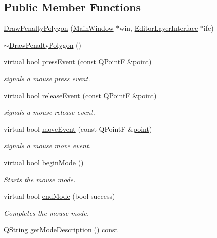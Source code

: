 \subsection*{Public Member Functions}
\begin{DoxyCompactItemize}
\item 
\mbox{\hyperlink{class_draw_penalty_polygon_af2f3eb1832f331c5c3244c9e6c403b74}{Draw\+Penalty\+Polygon}} (\mbox{\hyperlink{class_main_window}{Main\+Window}} $\ast$win, \mbox{\hyperlink{class_editor_layer_interface}{Editor\+Layer\+Interface}} $\ast$ifc)
\item 
\mbox{\hyperlink{class_draw_penalty_polygon_a706e3a1c22a058842eab17cbe43bcede}{$\sim$\+Draw\+Penalty\+Polygon}} ()
\item 
virtual bool \mbox{\hyperlink{class_draw_penalty_polygon_a52d402862dd2cf9072c6451beee36dc0}{press\+Event}} (const Q\+PointF \&\mbox{\hyperlink{diffusion_8cpp_a380468221cb8294f9329d11c99c4da30}{point}})
\begin{DoxyCompactList}\small\item\em signals a mouse press event. \end{DoxyCompactList}\item 
virtual bool \mbox{\hyperlink{class_draw_penalty_polygon_a6e6baf20d2b77cca3d4b15b2c8a64c16}{release\+Event}} (const Q\+PointF \&\mbox{\hyperlink{diffusion_8cpp_a380468221cb8294f9329d11c99c4da30}{point}})
\begin{DoxyCompactList}\small\item\em signals a mouse release event. \end{DoxyCompactList}\item 
virtual bool \mbox{\hyperlink{class_draw_penalty_polygon_a7532daff327db9c828c075ab13231058}{move\+Event}} (const Q\+PointF \&\mbox{\hyperlink{diffusion_8cpp_a380468221cb8294f9329d11c99c4da30}{point}})
\begin{DoxyCompactList}\small\item\em signals a mouse move event. \end{DoxyCompactList}\item 
virtual bool \mbox{\hyperlink{class_draw_penalty_polygon_aec0762e3c07b40959a01253ca081a34b}{begin\+Mode}} ()
\begin{DoxyCompactList}\small\item\em Starts the mouse mode. \end{DoxyCompactList}\item 
virtual bool \mbox{\hyperlink{class_draw_penalty_polygon_acf00ec45918544a8a33adc4582270c06}{end\+Mode}} (bool success)
\begin{DoxyCompactList}\small\item\em Completes the mouse mode. \end{DoxyCompactList}\item 
Q\+String \mbox{\hyperlink{class_draw_penalty_polygon_a55173a612268b53b34585ef0b2505ac0}{get\+Mode\+Description}} () const
\end{DoxyCompactItemize}
